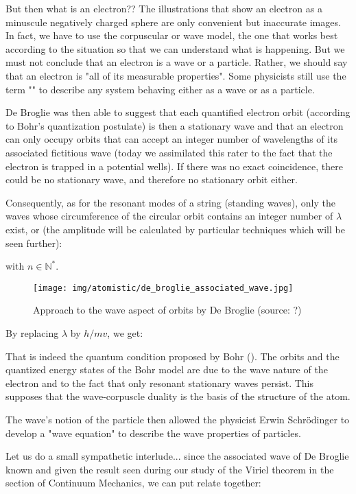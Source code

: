 	But then what is an electron?? The illustrations that show an electron as a minuscule negatively charged sphere are only convenient but inaccurate images. In fact, we have to use the corpuscular or wave model, the one that works best according to the situation so that we can understand what is happening. But we must not conclude that an electron is a wave or a particle. Rather, we should say that an electron is "all of its measurable properties". Some physicists still use the term "" to describe any system behaving either as a wave or as a particle.
	
	De Broglie was then able to suggest that each quantified electron orbit (according to Bohr's quantization postulate) is then a stationary wave and that an electron can only occupy orbits that can accept an integer number of wavelengths of its associated fictitious wave (today we assimilated this rater to the fact that the electron is trapped in a potential wells). If there was no exact coincidence, there could be no stationary wave, and therefore no stationary orbit either.
	
	Consequently, as for the resonant modes of a string (standing waves), only the waves whose circumference of the circular orbit contains an integer number of $\lambda$ exist, or (the amplitude will be calculated by particular techniques which will be seen further):
	
	with $n\in\mathbb{N}^{*}$.
	\begin{figure}[H]
		\centering
		\texttt{[image: img/atomistic/de\_broglie\_associated\_wave.jpg]}
		\caption{Approach to the wave aspect of orbits by De Broglie (source: ?)}
	\end{figure}
	By replacing $\lambda$ by $h/mv$, we get:
	
	That is indeed the quantum condition proposed by Bohr (). The orbits and the quantized energy states of the Bohr model are due to the wave nature of the electron and to the fact that only resonant stationary waves persist. This supposes that the wave-corpuscle duality is the basis of the structure of the atom.

	The wave's notion of the particle then allowed the physicist Erwin Schrödinger to develop a "wave equation" to describe the wave properties of particles.

	Let us do a small sympathetic interlude... since the associated wave of De Broglie known and given the result seen during our study of the Viriel theorem in the section of Continuum Mechanics, we can put relate together:
	
